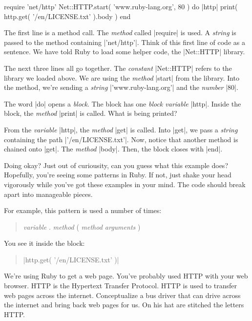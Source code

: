 \documentclass[12pt,twoside]{report}
\begin{document}
\begin{rubycode}

 require 'net/http'
 Net::HTTP.start( 'www.ruby-lang.org', 80 ) do |http|
   print( http.get( '/en/LICENSE.txt' ).body )
 end

\end{rubycode}


The first line is a method call.  The {\em method} called
\rubyinline|require| is used.  A {\em string} is
passed to the method containing
\rubyinline|'net/http'|.  Think of this first line of
code as a sentence.  We have told Ruby to load some helper code, the
\rubyinline|Net::HTTP| library.


The next three lines all go together.  The {\em constant}
\rubyinline|Net::HTTP| refers to the library we loaded
above. We are using the {\em method}
\rubyinline|start| from the library.  Into the method,
we're sending a {\em string}
\rubyinline|'www.ruby-lang.org'| and the {\em number}
\rubyinline|80|.

The word \rubyinline|do| opens a {\em block}.  The
block has one {\em block variable} \rubyinline|http|.
Inside the block, the {\em method} \rubyinline|print|
is called.  What is being printed?

From the {\em variable} \rubyinline|http|, the {\em
  method} \rubyinline|get| is called.  Into
\rubyinline|get|, we pass a {\em string} containing
the path \rubyinline|'/en/LICENSE.txt'|.  Now, notice
that another method is chained onto \rubyinline|get|.
The {\em method} \rubyinline|body|.  Then, the block
closes with \rubyinline|end|.

Doing okay?  Just out of curiousity, can you guess what this example
does?  Hopefully, you're seeing some patterns in Ruby.  If not, just
shake your head vigorously while you've got these examples in your
mind.  The code should break apart into manageable pieces.

\pagebreak

For example, this pattern is used a number of times:

\begin{quote}
{\em variable} . {\em method} ( {\em method arguments} )\end{quote}


You see it inside the block:

\begin{quote}
\rubyinline|http.get( '/en/LICENSE.txt' )|\end{quote}


We're using Ruby to get a web page.  You've probably used HTTP with
your web browser.  HTTP is the Hypertext Transfer Protocol.  HTTP is
used to transfer web pages across the internet.  Conceptualize a bus
driver that can drive across the internet and bring back web pages for
us.  On his hat are stitched the letters HTTP.
\end{document}
